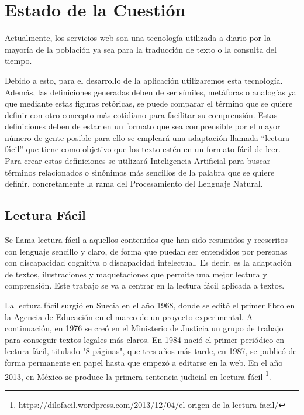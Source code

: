 \chapter{Estado de la Cuestión}
\label{cap:estadoDeLaCuestion}



Actualmente, los servicios web son una tecnología utilizada a diario por la mayoría de la población ya sea para la traducción de texto o la consulta del tiempo.

Debido a esto, para el desarrollo de la aplicación utilizaremos esta tecnología. Además, las definiciones generadas deben de ser símiles, metáforas o analogías ya que mediante estas figuras retóricas, se puede comparar el término que se quiere definir con otro concepto más cotidiano para facilitar su comprensión. Estas definiciones deben de estar en un formato que sea comprensible por el mayor número de gente posible para ello se empleará una adaptación llamada ``lectura fácil'' que tiene como objetivo que los texto estén en un formato fácil de leer. Para crear estas definiciones se utilizará Inteligencia Artificial para buscar términos relacionados o sinónimos más sencillos de la palabra que se quiere definir, concretamente la rama del Procesamiento del Lenguaje Natural.

\section{Lectura Fácil}
\label{cap:sec:lecturafacil}

Se llama lectura fácil a aquellos contenidos que han sido resumidos y reescritos con lenguaje sencillo y claro, de forma que puedan ser entendidos por personas con discapacidad cognitiva o discapacidad intelectual. Es decir, es la adaptación de textos, ilustraciones y maquetaciones que permite una mejor lectura y comprensión.
Este trabajo se va a centrar en la lectura fácil aplicada a textos.

La lectura fácil surgió en Suecia en el año 1968, donde se editó el primer libro en la Agencia de Educación en el marco de un proyecto experimental. A continuación, en 1976 se creó en el Ministerio de Justicia un grupo de trabajo para conseguir textos legales más claros.
En 1984 nació el primer periódico en lectura fácil, titulado "8 páginas", que tres años más tarde, en 1987, se publicó de forma permanente en papel hasta que empezó a editarse en la web. 
En el año 2013, en México se produce la primera sentencia judicial en lectura fácil \footnote{https://dilofacil.wordpress.com/2013/12/04/el-origen-de-la-lectura-facil/}.

